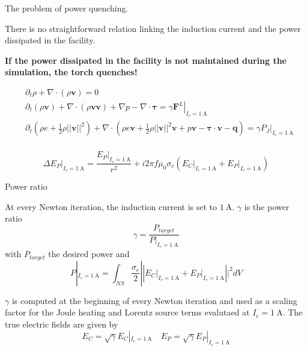 \documentclass[24pt,t,table, aspectratio=169]{beamer}
\newcommand{\vecF}{\mathbf{F}}
\newcommand{\vecq}{\mathbf{q}}
\newcommand{\vectau}{\boldsymbol{\tau}}
\newcommand{\vecv}{\mathbf{v}}
\begin{document}
\begin{frame}{The problem of power quenching.}

There is no straightforward relation linking the induction current and the power dissipated in the facility.

\textbf{If the power dissipated in the facility is not maintained during the simulation, the torch quenches!}

\begin{equation*}
	\begin{aligned}
		& \partial_t \rho + \nabla \cdot \left(\rho \vecv\right) =0\\
		& \partial_t \left(\rho \vecv\right) + \nabla \cdot \left(\rho \vecv \vecv\right) + \nabla p - \nabla \cdot \vectau = \gamma \left.\vecF^L\right|_{I_c = \SI{1}{\ampere}}\\
		& \partial_t \left(\rho e + \frac{1}{2} \rho ||\vecv||^2\right) + \nabla \cdot \left(\rho e \vecv + \frac{1}{2} \rho ||\vecv||^2 \vecv + p \vecv - \vectau \cdot \vecv - \vecq\right) = \gamma \left.P_J\right|_{I_c = \SI{1}{\ampere}}\\
	\end{aligned}
\end{equation*}

\begin{equation*}
	\Delta \left.E_P\right|_{I_c = \SI{1}{\ampere}} = \frac{\left.E_P\right|_{I_c = \SI{1}{\ampere}}}{r^2} + i 2 \pi f\mu_0\sigma_e \left(\left.E_C\right|_{I_c = \SI{1}{\ampere}} + \left.E_P\right|_{I_c = \SI{1}{\ampere}}\right)
\end{equation*}

\end{frame}

\begin{frame}{Power ratio}

At every Newton iteration, the induction current is set to $\SI{1}{\ampere}$. $\gamma$ is the power ratio
\begin{equation*}
\gamma = \frac{P_{target}}{P|_{I_c=\SI{1}{\ampere}}}
\end{equation*}
with $P_{target}$ the desired power and
\begin{equation*}
P|_{I_c=\SI{1}{\ampere}} = \int_{NS}\frac{\sigma_e}{2} ||\left.E_C\right|_{I_c = \SI{1}{\ampere}} + \left.E_P\right|_{I_c = \SI{1}{\ampere}}||^2 dV
\end{equation*}

$\gamma$ is computed at the beginning of every Newton iteration and used as a scaling factor for the Joule heating and Lorentz source terms evalutaed at $I_c = \SI{1}{\ampere}$. The true electric fields are given by
\begin{equation*}
E_C = \sqrt{\gamma} E_C|_{I_c = \SI{1}{\ampere}} \quad E_P = \sqrt{\gamma} E_P|_{I_c = \SI{1}{\ampere}}
\end{equation*}

\end{frame}
\end{document}

